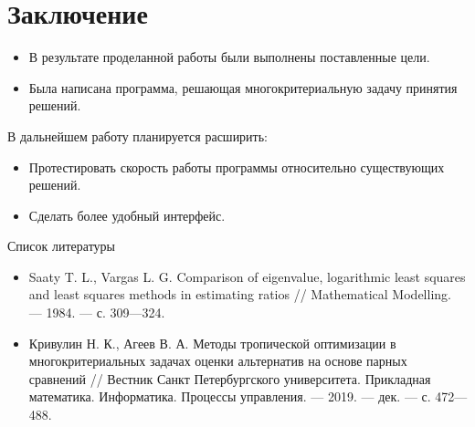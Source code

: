 \documentclass[ucs, notheorems, handout]{beamer}
\begin{document}
\section{Заключение}
\begin{frame}
	\begin{itemize}
		\item В результате проделанной работы были выполнены поставленные цели.
		\item Была написана программа, решающая многокритериальную задачу принятия решений.
	\end{itemize}

	В дальнейшем работу планируется расширить:
	\begin{itemize}
	\item Протестировать скорость работы программы относительно существующих решений.
	\item Сделать более удобный интерфейс.
	\end{itemize}
	
\end{frame}

\begin{frame}{Список литературы}
	\begin{itemize}
		\item Saaty T. L., Vargas L. G. Comparison of eigenvalue, logarithmic least squares and least squares methods in estimating ratios // Mathematical Modelling. — 1984. — с. 309—324.
		\item Кривулин Н. К., Агеев В. А. Методы тропической оптимизации в многокритериальных задачах оценки альтернатив на основе парных сравнений // Вестник Санкт­ Петербургского университета. Прикладная математика. Информатика. Процессы управления. — 2019. — дек. — с. 472—488.
	\end{itemize}
\end{frame}
\end{document}
